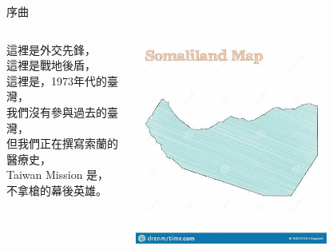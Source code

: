 \documentclass[aspectratio=169]{beamer}
\begin{document}
\begin{frame}{序曲}

\begin{columns}
    \begin{outline}
        這裡是外交先鋒，\\
        這裡是戰地後盾，\\
        這裡是，1973年代的臺灣，\\
        我們沒有參與過去的臺灣，\\
        但我們正在撰寫索蘭的醫療史，\\
        Taiwan Mission 是，\\
        不拿槍的幕後英雄。\\
    \end{outline}

\includegraphics[width=0.7\textwidth]{Somaliland.jpeg}
\end{columns}

\end{frame}


\end{document}
